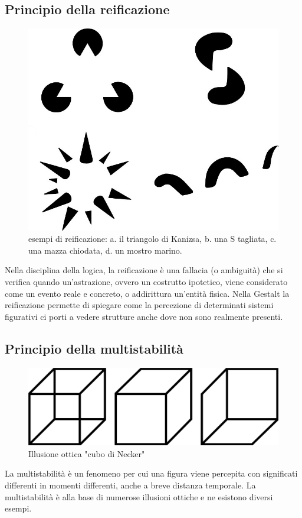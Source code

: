 \documentclass[11pt,a4paper]{article}
\begin{document}
\subsection{Principio della reificazione}
\begin{figure}
	\begin{center}
		\includegraphics[scale=0.3]{img/006.png}
	\end{center}
	\caption{esempi di reificazione: a. il triangolo di Kanizsa, b. una S tagliata, c. una mazza chiodata, d. un mostro marino.}
\end{figure}
Nella disciplina della logica, la reificazione è una fallacia (o ambiguità) che si verifica quando un'astrazione, ovvero un costrutto ipotetico, viene considerato come un evento reale e concreto, o addirittura un'entità fisica.
Nella Gestalt la reificazione permette di spiegare come la percezione di determinati sistemi figurativi ci porti a vedere strutture anche dove non sono realmente presenti.
\subsection{Principio della multistabilità}
\begin{figure}
	\begin{center}
		\includegraphics[scale=0.3]{img/007.png}
	\end{center}		
	\caption{Illusione ottica "cubo di Necker"}
\end{figure}
La multistabilità è un fenomeno per cui una figura viene percepita con significati differenti in momenti differenti, anche a breve distanza temporale. La multistabilità è alla base di numerose illusioni ottiche e ne esistono diversi esempi.
\end{document}
